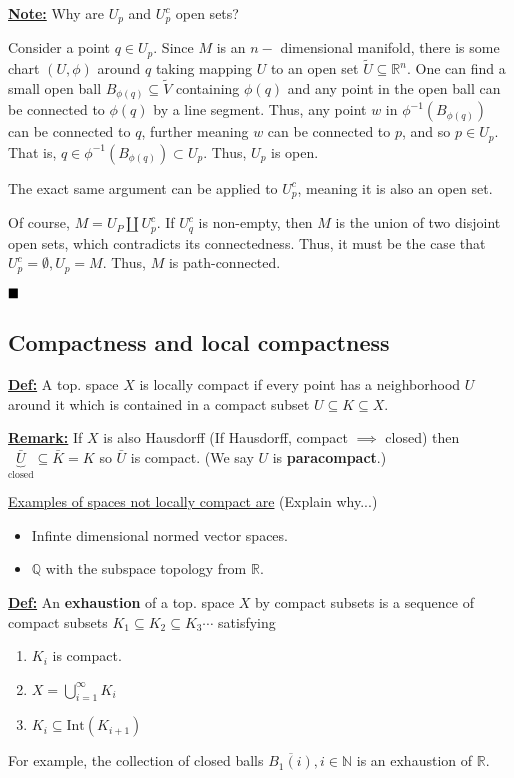 \documentclass{article}
\newcommand{\qedsymbol}{\hfill\blacksquare}
\begin{document}
\vskip 0.5cm
\begin{dottedbox}
  
\underline{\textbf{Note:}} Why are $U_p$ and $U_p^c$ open sets? 

Consider a point $q \in U_p$. Since $M$ is an $n-$ dimensional manifold, there is some chart $(U, \phi)$ around $q$ taking mapping $U$ to an open set $\tilde{U} \subseteq \mathbb{R}^n$. One can find a small open ball $B_{\phi(q)} \subseteq \tilde{V}$ containing $\phi(q)$ and any point in the open ball can be connected to $\phi(q)$ by a line segment. Thus, any point $w$ in $\phi^{-1}(B_{\phi(q)})$ can be connected to $q$, further meaning $w$ can be connected to $p$, and so $p \in U_p$. That is, $q \in \phi^{-1}(B_{\phi(q)}) \subset U_p$. Thus, $U_p$ is open.

\vskip 0.5cm
The exact same argument can be applied to $U_p^c$, meaning it is also an open set.
\end{dottedbox}

\vskip 0.5cm
Of course, $M = U_P \coprod U_p^c$. If $U_q^c$ is non-empty, then $M$ is the union of two disjoint open sets, which contradicts its connectedness. Thus, it must be the case that $U_p^c = \emptyset, U_p = M$. Thus, $M$ is path-connected.

$\qedsymbol$

\vskip 1cm
\subsection{Compactness and local compactness}
\vskip 0.5cm

\underline{\textbf{Def:}} A top. space $X$ is locally compact if every point has a neighborhood $U$ around it which is contained in a compact subset $U \subseteq K \subseteq X$.

\vskip 0.5cm
\underline{\textbf{Remark:}} If $X$ is also Hausdorff (If Hausdorff, compact $\implies$ closed) then $\underbrace{\bar{U}}_{\text{closed}} \subseteq \bar{K} = K$ so $\bar{U}$ is compact. (We say $U$ is \textbf{paracompact}.)

\vskip 0.5cm
\underline{Examples of spaces not locally compact are} (Explain why...)
\begin{itemize}
  \item Infinte dimensional normed vector spaces.
  \item $\mathbb{Q}$ with the subspace topology from $\mathbb{R}$.
\end{itemize}

\vskip 0.5cm
\underline{\textbf{Def:}} An \textbf{exhaustion} of a top. space $X$ by compact subsets is a sequence of compact subsets $K_1 \subseteq K_2 \subseteq K_3 \cdots$ satisfying
\begin{enumerate}
  \item $K_i$ is compact.
  \item $X = \bigcup_{ i = 1}^{\infty} K_i$
  \item $K_i \subseteq \text{Int}(K_{i+1})$  
\end{enumerate}
\vskip 0.5cm
For example, the collection of closed balls $\overline{B_1(i)}, i \in \mathbb{N}$ is an exhaustion of $\mathbb{R}$.
\end{document}
